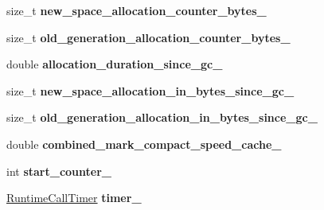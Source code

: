 \begin{DoxyCompactItemize}
\item 
size\+\_\+t {\bfseries new\+\_\+space\+\_\+allocation\+\_\+counter\+\_\+bytes\+\_\+}\hypertarget{classv8_1_1internal_1_1_g_c_tracer_a1fef6379144087bada99b9d4cf040356}{}\label{classv8_1_1internal_1_1_g_c_tracer_a1fef6379144087bada99b9d4cf040356}

\item 
size\+\_\+t {\bfseries old\+\_\+generation\+\_\+allocation\+\_\+counter\+\_\+bytes\+\_\+}\hypertarget{classv8_1_1internal_1_1_g_c_tracer_af5bad62f9224a50f8664cd365ec34d26}{}\label{classv8_1_1internal_1_1_g_c_tracer_af5bad62f9224a50f8664cd365ec34d26}

\item 
double {\bfseries allocation\+\_\+duration\+\_\+since\+\_\+gc\+\_\+}\hypertarget{classv8_1_1internal_1_1_g_c_tracer_a4bf66eec5e6785c806ff400f7aa23a47}{}\label{classv8_1_1internal_1_1_g_c_tracer_a4bf66eec5e6785c806ff400f7aa23a47}

\item 
size\+\_\+t {\bfseries new\+\_\+space\+\_\+allocation\+\_\+in\+\_\+bytes\+\_\+since\+\_\+gc\+\_\+}\hypertarget{classv8_1_1internal_1_1_g_c_tracer_acdf2afc204b03538c75bde8a72ed43fb}{}\label{classv8_1_1internal_1_1_g_c_tracer_acdf2afc204b03538c75bde8a72ed43fb}

\item 
size\+\_\+t {\bfseries old\+\_\+generation\+\_\+allocation\+\_\+in\+\_\+bytes\+\_\+since\+\_\+gc\+\_\+}\hypertarget{classv8_1_1internal_1_1_g_c_tracer_a6243739b61404dfcc05d38f409697937}{}\label{classv8_1_1internal_1_1_g_c_tracer_a6243739b61404dfcc05d38f409697937}

\item 
double {\bfseries combined\+\_\+mark\+\_\+compact\+\_\+speed\+\_\+cache\+\_\+}\hypertarget{classv8_1_1internal_1_1_g_c_tracer_a2f98182fef380619292541ceb4c90a34}{}\label{classv8_1_1internal_1_1_g_c_tracer_a2f98182fef380619292541ceb4c90a34}

\item 
int {\bfseries start\+\_\+counter\+\_\+}\hypertarget{classv8_1_1internal_1_1_g_c_tracer_aaa373d47ee44ea7008e3b0060f76fe61}{}\label{classv8_1_1internal_1_1_g_c_tracer_aaa373d47ee44ea7008e3b0060f76fe61}

\item 
\hyperlink{classv8_1_1internal_1_1_runtime_call_timer}{Runtime\+Call\+Timer} {\bfseries timer\+\_\+}\hypertarget{classv8_1_1internal_1_1_g_c_tracer_a70da13fa8012c3cad89b2cf1dfd656fe}{}\label{classv8_1_1internal_1_1_g_c_tracer_a70da13fa8012c3cad89b2cf1dfd656fe}


\end{DoxyCompactItemize}
